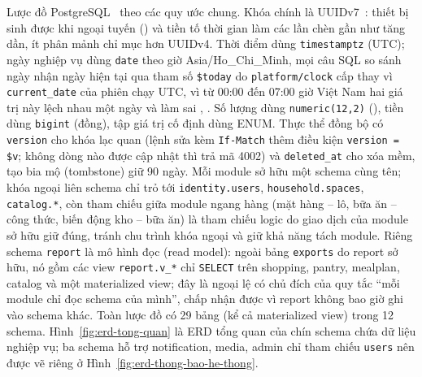 Lược đồ PostgreSQL~\cite{postgresql} theo các quy ước chung. Khóa chính là UUIDv7~\cite{rfc9562}: thiết bị sinh được khi ngoại tuyến () và tiền tố thời gian làm các lần chèn gần như tăng dần, ít phân mảnh chỉ mục hơn UUIDv4. Thời điểm dùng \texttt{timestamptz} (UTC); ngày nghiệp vụ dùng \texttt{date} theo giờ Asia/Ho\_Chi\_Minh, mọi câu SQL so sánh ngày nhận ngày hiện tại qua tham số \texttt{\$today} do \texttt{platform/clock} cấp thay vì \texttt{current\_date} của phiên chạy UTC, vì từ 00:00 đến 07:00 giờ Việt Nam hai giá trị này lệch nhau một ngày và làm sai , . Số lượng dùng \texttt{numeric(12,2)} (), tiền dùng \texttt{bigint} (đồng), tập giá trị cố định dùng ENUM. Thực thể đồng bộ có \texttt{version} cho khóa lạc quan (lệnh sửa kèm \texttt{If-Match} thêm điều kiện \texttt{version = \$v}; không dòng nào được cập nhật thì trả mã 4002) và \texttt{deleted\_at} cho xóa mềm, tạo bia mộ (tombstone) giữ 90 ngày. Mỗi module sở hữu một schema cùng tên; khóa ngoại liên schema chỉ trỏ tới \texttt{identity.users}, \texttt{household.spaces}, \texttt{catalog.*}, còn tham chiếu giữa module ngang hàng (mặt hàng -- lô, bữa ăn -- công thức, biến động kho -- bữa ăn) là tham chiếu logic do giao dịch của module sở hữu giữ đúng, tránh chu trình khóa ngoại và giữ khả năng tách module. Riêng schema \texttt{report} là mô hình đọc (read model): ngoài bảng \texttt{exports} do report sở hữu, nó gồm các view \texttt{report.v\_*} chỉ \texttt{SELECT} trên shopping, pantry, mealplan, catalog và một materialized view; đây là ngoại lệ có chủ đích của quy tắc “mỗi module chỉ đọc schema của mình”, chấp nhận được vì report không bao giờ ghi vào schema khác. Toàn lược đồ có 29 bảng (kể cả materialized view) trong 12 schema. Hình~\ref{fig:erd-tong-quan} là ERD tổng quan của chín schema chứa dữ liệu nghiệp vụ; ba schema hỗ trợ notification, media, admin chỉ tham chiếu \texttt{users} nên được vẽ riêng ở Hình~\ref{fig:erd-thong-bao-he-thong}.


